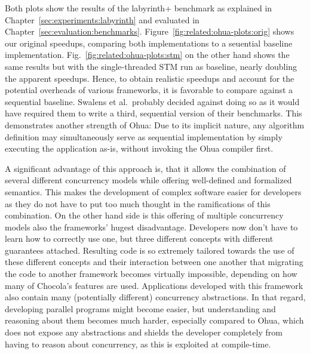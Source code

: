 Both plots show the results of the labyrinth+ benchmark as explained in Chapter~\ref{sec:experiments:labyrinth} and evaluated in Chapter~\ref{sec:evaluation:benchmarks}.
Figure~\ref{fig:related:ohua-plots:orig} shows our original speedups, comparing both implementations to a seuential baseline implementation.
Fig.~\ref{fig:related:ohua-plots:stm} on the other hand shows the same results but with the single-threaded STM run as baseline, nearly doubling the apparent speedups.
Hence, to obtain realistic speedups and account for the potential overheads of various frameworks, it is favorable to compare against a sequential baseline.
Swalens et al.\ probably decided against doing so as it would have required them to write a third, sequential version of their benchmarks.
This demonstrates another strength of Ohua: Due to its implicit nature, any algorithm definition may simultaneously serve as sequential implementation by simply executing the application as-is, without invoking the Ohua compiler first.

A significant advantage of this approach is, that it allows the combination of several different concurrency models while offering well-defined and formalized semantics.
This makes the development of complex software easier for developers as they do not have to put too much thought in the ramifications of this combination.
On the other hand side is this offering of multiple concurrency models also the frameworks' hugest disadvantage.
Developers now don't have to learn how to correctly use one, but three different concepts with different guarantees attached.
Resulting code is so extremely tailored towards the use of these different concepts and their interaction between one another that migrating the code to another framework becomes virtually impossible, depending on how many of Chocola's features are used.
Applications developed with this framework also contain many (potentially different) concurrency abstractions.
In that regard, developing parallel programs might become easier, but understanding and reasoning about them becomes much harder, especially compared to Ohua, which does not expose any abstractions and shields the developer completely from having to reason about concurrency, as this is exploited at compile-time.

